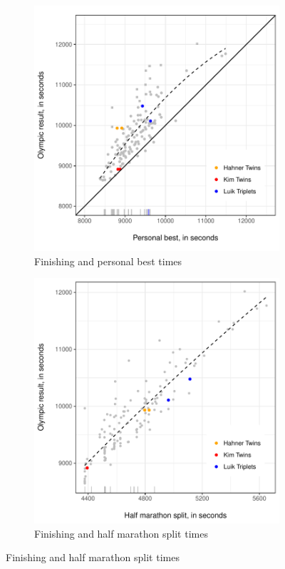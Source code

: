 \documentclass[12pt,titlepage]{article}
\begin{document}
\begin{figure}[!ht]
  \caption{Olympic results and measures of marathon ability}
  \label{fig:scatter}
  \begin{subfigure}{.5\textwidth}
    \centering
    \includegraphics[width=\textwidth, keepaspectratio]{scatter_plot.pdf}
    \caption{Finishing and personal best times}
    \label{fig:45degreeplot}
  \end{subfigure}
  \begin{subfigure}{.5\textwidth}
    \centering
    \includegraphics[width=\textwidth, keepaspectratio]{scatter_plot_half.pdf}
    \caption{Finishing and half marathon split times}
    \label{fig:45degreeplot_half}
  \end{subfigure}
\end{figure}
\end{document}
